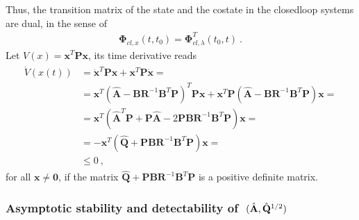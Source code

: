 \documentclass[letterpaper,10pt,english]{jupyterBook}
\begin{document}
\sphinxAtStartPar
Thus, the transition matrix of the state and the co\sphinxhyphen{}state in the closed\sphinxhyphen{}loop systems are dual, in the sense of
\begin{equation*}
\begin{split}\boldsymbol\Phi_{cl,x}(t,t_0) = \boldsymbol\Phi_{cl,\lambda}^T(t_0,t) \ .\end{split}
\end{equation*}
\sphinxAtStartPar
{} Let \(V(x) = \mathbf{x}^T \mathbf{P} \mathbf{x}\), its time derivative reads
\begin{equation*}
\begin{split}\begin{aligned}
  \dot{V}(x(t)) 
  & = \dot{\mathbf{x}}^T \mathbf{P} \mathbf{x} + \mathbf{x}^T \mathbf{P} \dot{\mathbf{x}} = \\
  & = \mathbf{x}^T ( \hat{\mathbf{A}} - \mathbf{B} \mathbf{R}^{-1} \mathbf{B}^T \mathbf{P} )^T \mathbf{P} \mathbf{x} + \mathbf{x}^T \mathbf{P} ( \hat{\mathbf{A}} - \mathbf{B} \mathbf{R}^{-1} \mathbf{B}^T \mathbf{P} ) \mathbf{x} = \\
  & = \mathbf{x}^T ( \hat{\mathbf{A}}^T \mathbf{P} + \mathbf{P} \hat{\mathbf{A}} - 2 \mathbf{P} \mathbf{B} \mathbf{R}^{-1} \mathbf{B}^T \mathbf{P} ) \mathbf{x} = \\
  & = - \mathbf{x}^T ( \hat{\mathbf{Q}} + \mathbf{P} \mathbf{B} \mathbf{R}^{-1} \mathbf{B}^T \mathbf{P} ) \mathbf{x} = \\
  & \le 0 \ ,
\end{aligned}\end{split}
\end{equation*}
\sphinxAtStartPar
for all \(\mathbf{x} \ne \mathbf{0}\), if the matrix \(\hat{\mathbf{Q}} + \mathbf{P} \mathbf{B} \mathbf{R}^{-1} \mathbf{B}^T \mathbf{P}\) is a positive definite matrix.
\subsubsection*{Asymptotic stability and detectability of \protect\(\ (\hat{\mathbf{A}}, \hat{\mathbf{Q}}^{1/2})\protect\)}
\end{document}
